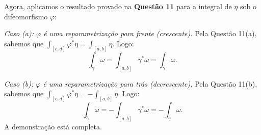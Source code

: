 {	Agora, aplicamos o resultado provado na \textbf{Questão 11} para a integral de $\eta$ sob o difeomorfismo $\varphi$:
	
	\textit{Caso (a): $\varphi$ é uma reparametrização para frente (crescente).}
	Pela Questão 11(a), sabemos que $\int_{[c,d]} \varphi^* \eta = \int_{[a,b]} \eta$. Logo:
	\begin{equation*}
		\int_{\tilde{\gamma}} \omega = \int_{[a,b]} \gamma^* \omega = \int_{\gamma} \omega.
	\end{equation*}
	
	\textit{Caso (b): $\varphi$ é uma reparametrização para trás (decrescente).}
	Pela Questão 11(b), sabemos que $\int_{[c,d]} \varphi^* \eta = -\int_{[a,b]} \eta$. Logo:
	\begin{equation*}
		\int_{\tilde{\gamma}} \omega = -\int_{[a,b]} \gamma^* \omega = -\int_{\gamma} \omega.
	\end{equation*}
	A demonstração está completa.
}



